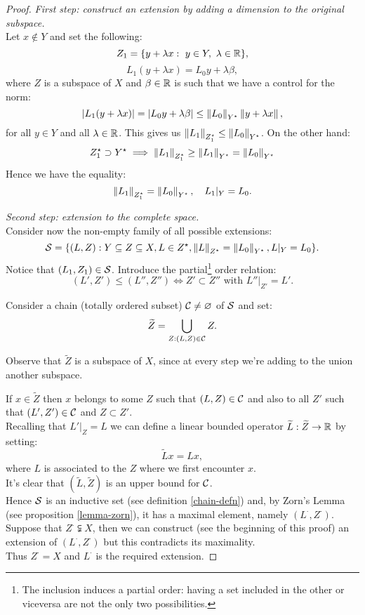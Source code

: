 \begin{proof}
	
	\textit{First step: construct an extension by adding a dimension to the original subspace.}\\
	Let $x \notin Y$ and set the following:
	$$Z_1 = \{y + \lambda x : \ y \in Y, \ \lambda \in \mathbb R \},$$
	$$L_1 (y + \lambda x) = L_0 y + \lambda \beta,$$
	where $Z$ is a subspace of $X$ and $\beta \in \mathbb R$ is such that we have a control for the norm:
	$$
		|L_1 ( y + \lambda x)|
		=|L_0 y + \lambda \beta|
		\leq \left\lVert L_0\right\rVert_{Y^\star} \left\lVert y + \lambda x\right\rVert
		,
	$$
	for all $y \in Y$ and all $\lambda \in \mathbb R$. This gives us $\left\lVert L_1\right\rVert_{Z^\star_1} \le \left\lVert L_0\right\rVert_{Y^\star}$. On the other hand:
	$$Z^\star_1 \supset Y^\star \implies \left\lVert L_1\right\rVert_{Z^\star_1} \geq \left\lVert L_1\right\rVert_{Y^\star} = \left\lVert L_0\right\rVert_{Y^\star}$$
	Hence we have the equality:
	$$\left\lVert L_1\right\rVert_{Z^\star_1} = \left\lVert L_0\right\rVert_{Y^\star}, \quad L_1|_Y = L_0.$$
	
	\textit{Second step: extension to the complete space.}\\
	Consider now the non-empty family of all possible extensions:
	$$ \mathcal S = \{ (L,Z): Y \subseteq Z \subseteq X, L \in Z^\star, \left\lVert L\right\rVert_{Z^\star} = \left\lVert L_0\right\rVert_{Y^\star}, L|_Y = L_0 \}.$$
	Notice that $(L_1, Z_1) \in \mathcal S$.
	Introduce the partial\footnote{The inclusion induces a partial order: having a set included in the other or viceversa are not the only two possibilities.} order relation:
	$$(L',Z') \leq (L'', Z'') \iff Z' \subset Z'' \text{ with } L''|_{Z'} = L'.$$
	
	Consider a chain (totally ordered subset) $\mathcal C \neq \varnothing$ of $\mathcal S$ and set: 
	$$ \widetilde Z = \bigcup_{Z: (L,Z) \in \mathcal C} Z.$$
	
	Observe that $\tilde Z$ is a subspace of $X$, since at every step we're adding to the union another subspace.
	
	If $x \in \tilde Z$ then $x$ belongs to some $Z$ such that $(L,Z) \in \mathcal C$ and also to all $Z'$ such that $(L', Z') \in \mathcal C$ and $Z \subset Z'$.\\
	Recalling that $L'|_Z = L$ we can define a linear bounded operator $\widetilde L : \widetilde Z \to \mathbb R$ by setting:
	$$\tilde Lx = Lx,$$
	where $L$ is associated to the $Z$ where we first encounter $x$.\\
	It's clear that $(\tilde L, \tilde Z)$ is an upper bound for $\mathcal C$.\\
	Hence $\mathcal S$ is an inductive set (see definition \vref{chain-defn}) and, by Zorn's Lemma (see proposition \vref{lemma-zorn}), it has a maximal element, namely $(L^\cdot, Z^\cdot)$.\\
	Suppose that $Z^\cdot \subsetneqq X$, then we can construct (see the beginning of this proof) an extension of $(L^\cdot, Z^\cdot)$ but this contradicts its maximality.\\
	Thus $Z^\cdot = X$ and $L^\cdot$ is the required extension.
\end{proof}

